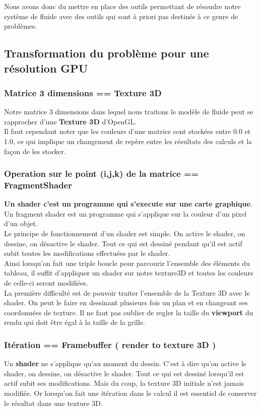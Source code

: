 \documentclass[a4paper,10pt]{article}
\begin{document}
Nous avons donc du mettre en place des outils permettant de résoudre
notre système de fluide avec des outils qui sont à priori pas destinés
à ce genre de problèmes.

\subsection{Transformation du problème pour une résolution GPU}

\subsubsection{Matrice 3 dimensions == Texture 3D}
Notre matrice 3 dimensions dans lequel nous traitons le modèle de
fluide peut se rapprocher d'une \textbf{Texture 3D} d'OpenGL. \\
Il faut cependant noter que les couleurs d'une matrice sont stockées entre 0.0 et 1.0,
ce qui implique un changement de repère entre les résultats des calculs
et la façon de les stocker.

\subsubsection{Operation sur le point (i,j,k) de la matrice == FragmentShader}
\textbf{Un shader c'est un programme qui s'execute sur une carte graphique}. 
Un fragment shader est un programme qui s'applique sur la couleur d'un pixel d'un objet.\\ 

Le principe de fonctionnement d'un shader est simple. On active le
shader, on dessine, on désactive le shader. Tout ce qui est dessiné
pendant qu'il est actif subit toutes les modifications effectuées par
le shader.\\ 

Ainsi lorsqu'on fait une triple boucle pour parcourir l'ensemble des
éléments du tableau, il suffit d'appliquer un shader sur notre
texture3D et toutes les couleurs de celle-ci seront modifiées.\\

La première difficulté est de pouvoir traiter l'ensemble de la Texture
3D avec le shader. On peut le faire en dessinant plusieurs fois un
plan et en changeant ses coordonnées de texture.
Il ne faut pas oublier de regler la taille du  \textbf{viewport} du rendu
qui doit être égal à la taille de la grille.


\subsubsection{Itération == Framebuffer ( render to texture 3D ) }
Un \textbf{shader} ne s'applique qu'au moment du dessin.  C'est à dire
qu'on active le shader, on dessine, on désactive le shader. Tout ce
qui est dessiné lorsqu'il est actif subit ses modifications. Mais du
coup, la texture 3D initiale n'est jamais modifiée. Or lorsqu'on fait
une itération dans le calcul il est essentiel de conserver le résultat
dans une texture 3D.\\ 
\end{document}
